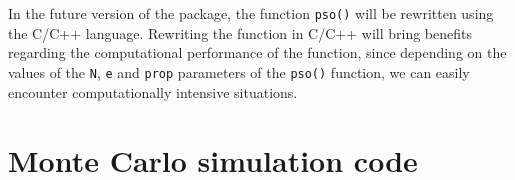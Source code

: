 \documentclass[10pt,letterpaper]{article}
\begin{document}
In the future version of the package, the function \texttt{pso()} will be rewritten using the \textsc{C}/\textsc{C++} language. Rewriting the function in \textsc{C}/\textsc{C++} will bring benefits regarding the computational performance of the function, since depending on the values of the \texttt{N}, \texttt{e} and \texttt{prop} parameters of the \texttt{pso()} function, we can easily encounter computationally intensive situations.







\appendix


\section{Monte Carlo simulation code}
\label{code:simulation_mc}
\end{document}
